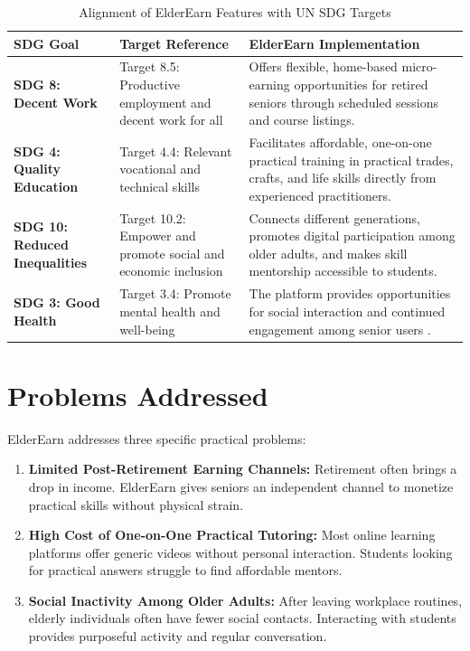 \documentclass[12pt,a4paper]{report}
\begin{document}
\begin{table}[H]
\centering
\small
\caption{Alignment of ElderEarn Features with UN SDG Targets}
\label{tab:sdg_alignment}
\begin{tabularx}{\textwidth}{|L{2.2cm}|L{4.2cm}|J|}
\hline
\textbf{SDG Goal} & \textbf{Target Reference} & \textbf{ElderEarn Implementation} \\ \hline
\textbf{SDG 8: Decent Work} & Target 8.5: Productive employment and decent work for all & Offers flexible, home-based micro-earning opportunities for retired seniors through scheduled sessions and course listings. \\ \hline
\textbf{SDG 4: Quality Education} & Target 4.4: Relevant vocational and technical skills & Facilitates affordable, one-on-one practical training in practical trades, crafts, and life skills directly from experienced practitioners. \\ \hline
\textbf{SDG 10: Reduced Inequalities} & Target 10.2: Empower and promote social and economic inclusion & Connects different generations, promotes digital participation among older adults, and makes skill mentorship accessible to students. \\ \hline
\textbf{SDG 3: Good Health} & Target 3.4: Promote mental health and well-being & The platform provides opportunities for social interaction and continued engagement among senior users \cite{whoaging}. \\ \hline
\end{tabularx}
\end{table}

\section{Problems Addressed}
ElderEarn addresses three specific practical problems:
\begin{enumerate}[leftmargin=1.5em, itemsep=2pt]
  \item \textbf{Limited Post-Retirement Earning Channels:} Retirement often brings a drop in income. ElderEarn gives seniors an independent channel to monetize practical skills without physical strain.
  \item \textbf{High Cost of One-on-One Practical Tutoring:} Most online learning platforms offer generic videos without personal interaction. Students looking for practical answers struggle to find affordable mentors.
  \item \textbf{Social Inactivity Among Older Adults:} After leaving workplace routines, elderly individuals often have fewer social contacts. Interacting with students provides purposeful activity and regular conversation.
\end{enumerate}
\end{document}
